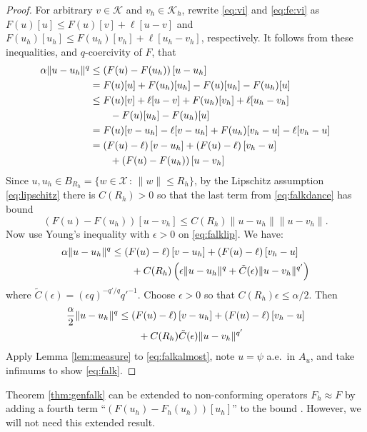 \documentclass[]{interact}
\theoremstyle{plain}%
\theoremstyle{definition}
\theoremstyle{remark}
\newcommand{\eps}{\epsilon}
\newcommand{\cK}{\mathcal{K}}
\newcommand{\cX}{\mathcal{X}}
\begin{document}
\begin{proof}  For arbitrary $v\in\cK$ and $v_h\in\cK_h$, rewrite \eqref{eq:vi} and \eqref{eq:fe:vi} as $F(u)[u] \le F(u)[v] + \ell[u-v]$ and $F(u_h)[u_h] \le F(u_h)[v_h] + \ell[u_h-v_h]$, respectively.  It follows from these inequalities, and $q$-coercivity of $F$, that
\begin{align}
\alpha \|u-u_h\|^q &\le \left(F(u)-F(u_h)\right)[u-u_h] \label{eq:falkdance} \\
  &= F(u)[u] + F(u_h)[u_h] - F(u)[u_h] - F(u_h)[u] \notag \\
  &\le F(u)[v] + \ell[u-v] + F(u_h)[v_h] + \ell[u_h-v_h] \notag \\
  &\qquad - F(u)[u_h] - F(u_h)[u] \notag \\
  &= F(u)[v-u_h] - \ell[v-u_h] + F(u_h)[v_h-u] - \ell[v_h-u] \notag \\
  &= \left(F(u)-\ell\right)[v-u_h] + \left(F(u)-\ell\right)[v_h-u] \notag \\
  &\qquad + \left(F(u)-F(u_h)\right)[u-v_h] \notag
\end{align}
Since $u,u_h\in B_{R_h} = \{w\in\cX\,:\,\|w\|\le R_h\}$, by the Lipschitz assumption \eqref{eq:lipschitz} there is $C(R_h)>0$ so that the last term from \eqref{eq:falkdance} has bound
\begin{equation}
\left(F(u)-F(u_h)\right)[u-v_h] \le C(R_h) \|u-u_h\|\|u-v_h\|. \label{eq:falklip}
\end{equation}
Now use Young's inequality with $\eps>0$ \cite[Appendix B.2]{Evans2010} on \eqref{eq:falklip}.  We have:
\begin{align}
\alpha \|u-u_h\|^q &\le \left(F(u)-\ell\right)[v-u_h] + \left(F(u)-\ell\right)[v_h-u]  \label{eq:falkyoung} \\
  &\qquad + C(R_h) \left(\eps\|u-u_h\|^q + \tilde C(\eps) \|u-v_h\|^{q'}\right) \notag
\end{align}
where $\tilde C(\eps) = (\eps q)^{-q'/q} {q'}^{-1}$.  Choose $\eps>0$ so that $C(R_h) \eps \le \alpha/2$.  Then
\begin{align}
\frac{\alpha}{2} \|u-u_h\|^q &\le \left(F(u)-\ell\right)[v-u_h] + \left(F(u)-\ell\right)[v_h-u]  \label{eq:falkalmost} \\
  &\qquad + C(R_h) \tilde C(\eps) \|u-v_h\|^{q'} \notag
\end{align}
Apply Lemma \ref{lem:measure} to \eqref{eq:falkalmost}, note $u=\psi$ a.e.~in $A_u$, and take infimums to show \eqref{eq:falk}.\end{proof}

Theorem \ref{thm:genfalk} can be extended to non-conforming operators $F_h\approx F$ by adding a fourth term ``$(F(u_h)-F_h(u_h))[u_h]$'' to the bound \cite[Theorem 6.3]{Bueler2024}.  However, we will not need this extended result.
\end{document}
